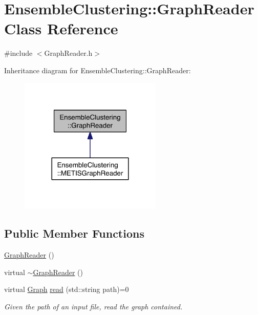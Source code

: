 \hypertarget{class_ensemble_clustering_1_1_graph_reader}{\section{Ensemble\-Clustering\-:\-:Graph\-Reader Class Reference}
\label{class_ensemble_clustering_1_1_graph_reader}
}


{\ttfamily \#include $<$Graph\-Reader.\-h$>$}



Inheritance diagram for Ensemble\-Clustering\-:\-:Graph\-Reader\-:
\nopagebreak
\begin{figure}[H]
\begin{center}
\leavevmode
\includegraphics[width=192pt]{class_ensemble_clustering_1_1_graph_reader__inherit__graph}
\end{center}
\end{figure}
\subsection*{Public Member Functions}
\begin{DoxyCompactItemize}
\item 
\hyperlink{class_ensemble_clustering_1_1_graph_reader_af10201a2e434e641eb0be9d76b3eeaa8}{Graph\-Reader} ()
\item 
virtual \hyperlink{class_ensemble_clustering_1_1_graph_reader_ac754a7d66fd3d3375dbd5abbe5fd5cff}{$\sim$\-Graph\-Reader} ()
\item 
virtual \hyperlink{class_ensemble_clustering_1_1_graph}{Graph} \hyperlink{class_ensemble_clustering_1_1_graph_reader_af5e1d1071dabe620f2ee52577c641f4d}{read} (std\-::string path)=0
\begin{DoxyCompactList}\small\item\em Given the path of an input file, read the graph contained. \end{DoxyCompactList}\end{DoxyCompactItemize}


